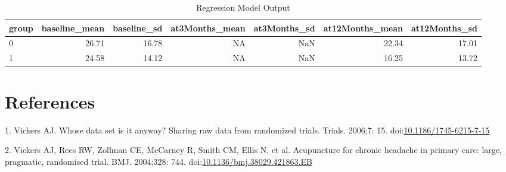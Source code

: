 \documentclass[10pt,letterpaper]{article}
\begin{document}
\begin{table}[t]

\caption{\label{tab:table2}Regression Model Output}
\centering
\begin{tabular}{l|r|r|r|r|r|r}
\hline
group & baseline\_mean & baseline\_sd & at3Months\_mean & at3Months\_sd & at12Months\_mean & at12Months\_sd\\
\hline
0 & 26.71 & 16.78 & NA & NaN & 22.34 & 17.01\\
\hline
1 & 24.58 & 14.12 & NA & NaN & 16.25 & 13.72\\
\hline
\end{tabular}
\end{table}

\hypertarget{references}{%
\section*{References}\label{references}}

\hypertarget{refs}{}
\leavevmode\hypertarget{ref-Vickers2006}{}%
1. Vickers AJ. Whose data set is it anyway? Sharing raw data from
randomized trials. Trials. 2006;7: 15.
doi:\href{https://doi.org/10.1186/1745-6215-7-15}{10.1186/1745-6215-7-15}

\leavevmode\hypertarget{ref-Vickers2004}{}%
2. Vickers AJ, Rees RW, Zollman CE, McCarney R, Smith CM, Ellis N, et
al. Acupuncture for chronic headache in primary care: large, pragmatic,
randomised trial. BMJ. 2004;328: 744.
doi:\href{https://doi.org/10.1136/bmj.38029.421863.EB}{10.1136/bmj.38029.421863.EB}

\nolinenumbers
\end{document}
